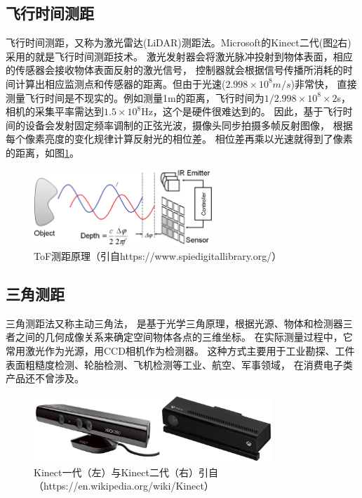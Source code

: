 \subsection{飞行时间测距}
飞行时间测距，又称为激光雷达(LiDAR)测距法。Microsoft的Kinect二代(图\ref{kinect_v1_v2}右)采用的就是飞行时间测距技术。
激光发射器会将激光脉冲投射到物体表面，相应的传感器会接收物体表面反射的激光信号，
控制器就会根据信号传播所消耗的时间计算出相应监测点和传感器的距离。但由于光速(\(2.998 \times 10^8 m/s\))非常快，
直接测量飞行时间是不现实的。例如测量1m的距离，飞行时间为\(1/2.998 \times 10^8 \times 2\)s，
相机的采集平率需达到\(1.5 \times 10^8\)Hz，这个是硬件很难达到的。
因此，基于飞行时间的设备会发射固定频率调制的正弦光波，摄像头同步拍摄多帧反射图像，
根据每个像素亮度的变化规律计算反射光的相位差。
相位差再乘以光速就得到了像素的距离，如图\ref{tof}。
\begin{figure}[h]
    \centering
    \includegraphics[width = 0.6\textwidth]{./Pictures/TOF.eps}
    \caption{
        ToF测距原理（引自https://www.spiedigitallibrary.org/）
        }
    \label{tof}
\end{figure}

\subsection{三角测距}
三角测距法又称主动三角法，
是基于光学三角原理，根据光源、物体和检测器三者之间的几何成像关系来确定空间物体各点的三维坐标。
在实际测量过程中，它常用激光作为光源，用CCD相机作为检测器。
这种方式主要用于工业勘探、工件表面粗糙度检测、轮胎检测、飞机检测等工业、航空、军事领域，
在消费电子类产品还不曾涉及。
\begin{figure}[h]
    \centering
    \includegraphics[width = 0.8\textwidth]{./Pictures/kinect_v1_v2.eps}
    \caption{Kinect一代（左）与Kinect二代（右）引自（https://en.wikipedia.org/wiki/Kinect）}
    \label{kinect_v1_v2}
\end{figure}

